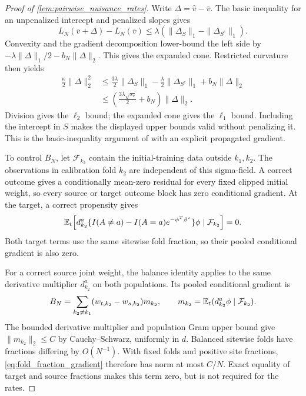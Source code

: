 \documentclass[12pt]{article}
\begin{document}
\begin{proof}[Proof of \cref{lem:pairwise_nuisance_rates}]
Write $\Delta=\widehat v-\bar v$. The basic inequality for an unpenalized intercept and penalized slopes gives
\[
L_N(\bar v+\Delta)-L_N(\bar v)
\le\lambda(\|\Delta_S\|_1-\|\Delta_{S^c}\|_1).
\]
Convexity and the gradient decomposition lower-bound the left side by $-\lambda\|\Delta\|_1/2-b_N\|\Delta\|_2$. This gives the expanded cone. Restricted curvature then yields
\[
\begin{aligned}
\frac\kappa2\|\Delta\|_2^2
&\le\frac{3\lambda}{2}\|\Delta_S\|_1
-\frac\lambda2\|\Delta_{S^c}\|_1+b_N\|\Delta\|_2\\
&\le\left(\frac{3\lambda\sqrt{s_v}}2+b_N\right)\|\Delta\|_2.
\end{aligned}
\]
Division gives the $\ell_2$ bound; the expanded cone gives the $\ell_1$ bound. Including the intercept in $S$ makes the displayed upper bounds valid without penalizing it. This is the basic-inequality argument of \citet{negahban2012unified} with an explicit propagated gradient.

To control $B_N$, let $\mathcal F_{k_2}$ contain the initial-training data outside $k_1,k_2$. The observations in calibration fold $k_2$ are independent of this sigma-field. A correct outcome gives a conditionally mean-zero residual for every fixed clipped initial weight, so every source or target outcome block has zero conditional gradient. At the target, a correct propensity gives
\[
\mathbb{E}_t\!\left[d_{k_2}^a\{I(A\ne a)-I(A=a)e^{-\phi^T\beta^\star}\}\phi
\mid\mathcal F_{k_2}\right]=0.
\]
Both target terms use the same sitewise fold fraction, so their pooled conditional gradient is also zero.

For a correct source joint weight, the balance identity applies to the same derivative multiplier $d_{k_2}^a$ on both populations. Its pooled conditional gradient is
\begin{equation}\label{eq:fold_fraction_gradient}
B_N=\sum_{k_2\ne k_1}(w_{t,k_2}-w_{s,k_2})m_{k_2},
\qquad m_{k_2}=\mathbb{E}_t(d_{k_2}^a\phi\mid\mathcal F_{k_2}).
\end{equation}
The bounded derivative multiplier and population Gram upper bound give $\|m_{k_2}\|_2\le C$ by Cauchy--Schwarz, uniformly in $d$. Balanced sitewise folds have fractions differing by $O(N^{-1})$. With fixed folds and positive site fractions, \cref{eq:fold_fraction_gradient} therefore has norm at most $C/N$. Exact equality of target and source fractions makes this term zero, but is not required for the rates.


\end{proof}
\end{document}
